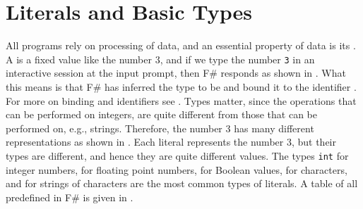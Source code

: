 \documentclass[fsharpNotes.tex]{subfiles}
\begin{document}

\section{Literals and Basic Types}
All programs rely on processing of data, and an essential property of data is its . A  is a fixed value like the number 3, and if we type the number \lstinline!3! in an interactive session at the input prompt, then F\# responds as shown in .
%
%
What this means is that F\# has inferred the type to be  and bound it to the identifier . For more on binding and identifiers see . Types matter, since the operations that can be performed on integers, are quite different from those that can be performed on, e.g., strings. Therefore, the number 3 has many different representations as shown in .
%
%
Each literal represents the number 3, but their types are different, and hence they are quite different values. The types \lstinline!int! for integer numbers,  for floating point numbers,  for Boolean values,  for characters, and  for strings of characters are the most common types of literals. A table of all  predefined in F\# is given in .
\end{document}
